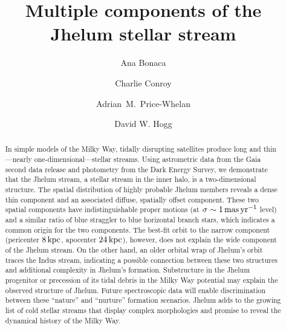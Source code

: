 \documentclass[twocolumn]{aastex62}
\begin{document}
\sloppy\sloppypar\raggedbottom\frenchspacing %

\title{Multiple components of the Jhelum stellar stream}


\author[0000-0002-7846-9787]{Ana Bonaca}

\author[0000-0002-1590-8551]{Charlie Conroy}

\author[0000-0003-0872-7098]{Adrian~M.~Price-Whelan}

\author[0000-0003-2866-9403]{David W. Hogg}

\begin{abstract}\noindent %
In simple models of the Milky Way, tidally disrupting satellites produce long and thin---nearly one-dimensional---stellar streams.
Using astrometric data from the Gaia second data release and photometry from the Dark Energy Survey, we demonstrate that the Jhelum stream, a stellar stream in the inner halo, is a two-dimensional structure.
The spatial distribution of highly probable Jhelum members reveals a dense thin component and an associated diffuse, spatially offset component.
These two spatial components have indistinguishable proper motions (at $\sigma\sim1\,\rm mas\,yr^{-1}$ level) and a similar ratio of blue straggler to blue horizontal branch stars, which indicates a common origin for the two components.
The best-fit orbit to the narrow component (pericenter $8\,\rm kpc$, apocenter $24\,\rm kpc$), however, does not explain the wide component of the Jhelum stream.
On the other hand, an older orbital wrap of Jhelum's orbit traces the Indus stream, indicating a possible connection between these two structures and additional complexity in Jhelum's formation.
Substructure in the Jhelum progenitor or precession of its tidal debris in the Milky Way potential may explain the observed structure of Jhelum.
Future spectroscopic data will enable discrimination between these ``nature'' and ``nurture'' formation scenarios.
Jhelum adds to the growing list of cold stellar streams that display complex morphologies and promise to reveal the dynamical history of the Milky Way.
\end{abstract}
\end{document}
